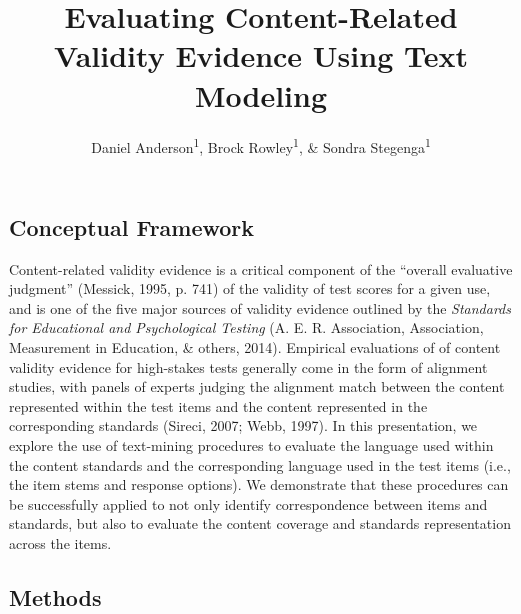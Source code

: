 \documentclass[doc]{apa6}
\title{Evaluating Content-Related Validity Evidence Using Text Modeling}
\author{Daniel Anderson\textsuperscript{1}, Brock Rowley\textsuperscript{1}, \& Sondra Stegenga\textsuperscript{1}}
\affiliation{
    \vspace{0.5cm}
          \textsuperscript{1} University of Oregon  }
\theoremstyle{definition}
\theoremstyle{definition}
\theoremstyle{definition}
\theoremstyle{remark}
\begin{document}
\maketitle

\setcounter{secnumdepth}{0}



\hypertarget{conceptual-framework}{%
\subsection{Conceptual Framework}\label{conceptual-framework}}

Content-related validity evidence is a critical component of the
\enquote{overall evaluative judgment} (Messick, 1995, p. 741) of the
validity of test scores for a given use, and is one of the five major
sources of validity evidence outlined by the \emph{Standards for
Educational and Psychological Testing} (A. E. R. Association,
Association, Measurement in Education, \& others, 2014). Empirical
evaluations of of content validity evidence for high-stakes tests
generally come in the form of alignment studies, with panels of experts
judging the alignment match between the content represented within the
test items and the content represented in the corresponding standards
(Sireci, 2007; Webb, 1997). In this presentation, we explore the use of
text-mining procedures to evaluate the language used within the content
standards and the corresponding language used in the test items (i.e.,
the item stems and response options). We demonstrate that these
procedures can be successfully applied to not only identify
correspondence between items and standards, but also to evaluate the
content coverage and standards representation across the items.

\hypertarget{methods}{%
\subsection{Methods}\label{methods}}
\end{document}
